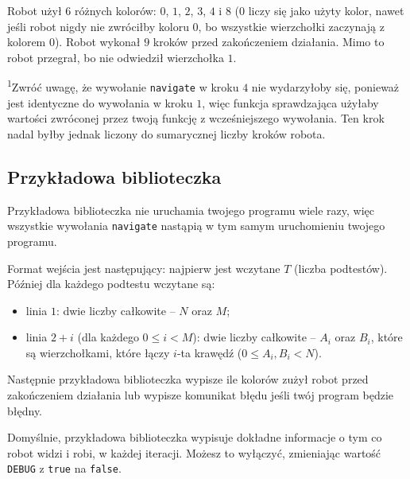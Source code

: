 \documentclass[12pt]{article}
\begin{document}
Robot użył $6$ różnych kolorów: $0$, $1$, $2$, $3$, $4$ i $8$ ($0$ liczy się jako użyty kolor, nawet jeśli robot nigdy nie zwróciłby koloru $0$, bo wszystkie wierzchołki zaczynają z kolorem $0$). Robot wykonał $9$ kroków przed zakończeniem działania. Mimo to robot przegrał, bo nie odwiedził wierzchołka $1$.

\textsuperscript{1}Zwróć uwagę, że wywołanie \texttt{navigate} w kroku $4$ nie wydarzyłoby się, ponieważ jest identyczne do wywołania w kroku $1$, więc funkcja sprawdzająca użyłaby wartości zwróconej przez twoją funkcję z wcześniejszego wywołania. Ten krok nadal byłby jednak liczony do sumarycznej liczby kroków robota.

\subsection{Przykładowa biblioteczka}

Przykładowa biblioteczka nie uruchamia twojego programu wiele razy, więc wszystkie wywołania \texttt{navigate} nastąpią w tym samym uruchomieniu twojego programu.

Format wejścia jest następujący: najpierw jest wczytane $T$ (liczba podtestów). Później dla każdego podtestu wczytane są:
\begin{itemize}
\item linia $1$: dwie liczby całkowite -- $N$ oraz $M$;
\item linia $2+i$ (dla każdego $0 \leq i < M$): dwie liczby całkowite -- $A_i$ oraz $B_i$, które są wierzchołkami, które łączy $i$-ta krawędź ($0 \leq A_i, B_i < N$).
\end{itemize}

Następnie przykładowa biblioteczka wypisze ile kolorów zużył robot przed zakończeniem działania lub wypisze komunikat błędu jeśli twój program będzie błędny.

Domyślnie, przykładowa biblioteczka wypisuje dokładne informacje o tym co robot widzi i robi, w każdej iteracji. Możesz to wyłączyć, zmieniając wartość \texttt{DEBUG} z \texttt{true} na \texttt{false}.
\end{document}

